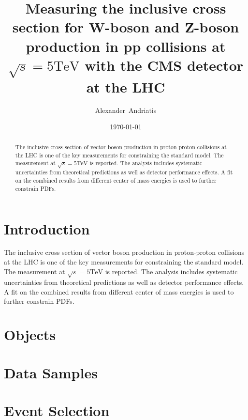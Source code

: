 \documentclass[aps,prd,final,twocolumn,letterpaper]{revtex4}
\begin{document}
	\title{Measuring the inclusive cross section for W-boson and Z-boson production in pp collisions at $\sqrt{s}=5\si{\tera\electronvolt}$ with the CMS detector at the LHC}
	\author{Alexander~Andriatis}
	\date{\today} 
	
	\begin{abstract}
		\noindent	
		The inclusive cross section of vector boson production in proton-proton collisions at the LHC is one of the key measurements for constraining the standard model. The measurement at $\sqrt{s}=5\si{\tera\electronvolt}$ is reported. The analysis includes systematic uncertainties from theoretical predictions as well as detector performance effects. A fit on the combined results from different center of mass energies is used to further constrain PDFs.
	\end{abstract}
	
	\maketitle
	
	\tableofcontents
	
	\pagestyle{myheadings}
	\thispagestyle{empty}
	
	\section{Introduction}	
		The inclusive cross section of vector boson production in proton-proton collisions at the LHC is one of the key measurements for constraining the standard model. The measurement at $\sqrt{s}=5\si{\tera\electronvolt}$ is reported. The analysis includes systematic uncertainties from theoretical predictions as well as detector performance effects. A fit on the combined results from different center of mass energies is used to further constrain PDFs.
	
	\section{Objects}
	\section{Data Samples}
	\section{Event Selection}
\end{document}

